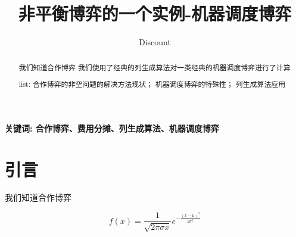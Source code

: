 \documentclass[UTF8]{article}
\author {Discount}
\title {非平衡博弈的一个实例-机器调度博弈}
\date{}
\begin{document}
    \maketitle

\begin{abstract}
    我们知道合作博弈
    我们使用了经典的列生成算法对一类经典的机器调度博弈进行了计算

list: 合作博弈的非空问题的解决方法现状；
      机器调度博弈的特殊性；
      列生成算法应用





\end{abstract}

\qquad \textbf{关键词: 合作博弈、费用分摊、列生成算法、机器调度博弈}

\section{引言}

我们知道合作博弈




$$
f(x)=\frac{1}{\sqrt{2 \pi \sigma x}} e^{-\frac{(x-\mu)^{2}}{2 \sigma^{2}}}
$$
\end{document}
